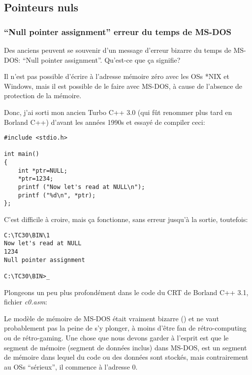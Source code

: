 \subsection{Pointeurs nuls}

\subsubsection{``Null pointer assignment'' erreur du temps de MS-DOS}

Des anciens peuvent se souvenir d'un message d'erreur bizarre du temps de MS-DOS:
``Null pointer assignment''.
Qu'est-ce que ça signifie?

Il n'est pas possible d'écrire à l'adresse mémoire zéro avec les OSs *NIX et Windows,
mais il est possible de le faire avec MS-DOS, à cause de l'absence de protection
de la mémoire.

Donc, j'ai sorti mon ancien Turbo C++ 3.0 (qui fût renommer plus tard en Borland C++)
d'avant les années 1990s et essayé de compiler ceci:

\begin{lstlisting}[style=customc]
#include <stdio.h>

int main()
{
	int *ptr=NULL;
	*ptr=1234;
	printf ("Now let's read at NULL\n");
	printf ("%d\n", *ptr);
};
\end{lstlisting}

C'est difficile à croire, mais ça fonctionne, sans erreur jusqu'à la sortie, toutefois:

\begin{lstlisting}[caption=Ancient Turbo C 3.0]
C:\TC30\BIN\1
Now let's read at NULL
1234
Null pointer assignment

C:\TC30\BIN>_
\end{lstlisting}

Plongeons un peu plus profondément dans le code du \ac{CRT} de Borland C++ 3.1, fichier \emph{c0.asm}:



Le modèle de mémoire de MS-DOS était vraiment bizarre () et
ne vaut probablement pas la peine de s'y plonger, à moins d'être fan de rétro-computing
ou de rétro-gaming.
Une chose que nous devons garder à l'esprit est que le segment de mémoire (segment
de données inclus) dans MS-DOS, est un segment de mémoire dans lequel du code ou
des données sont stockés, mais contrairement au \ac{OS}s ``sérieux'', il commence
à l'adresse 0.

